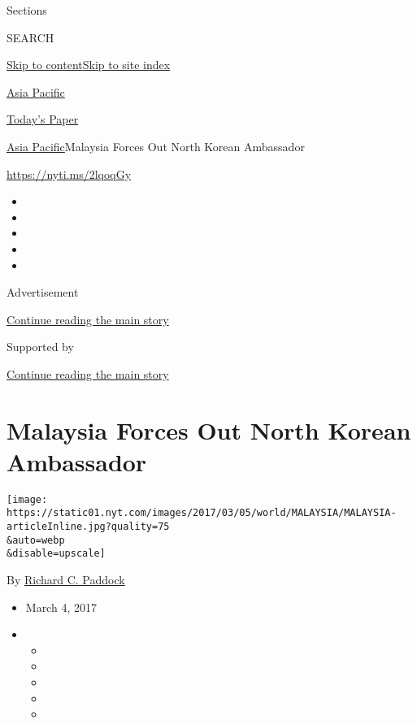 Sections

SEARCH

\protect\hyperlink{site-content}{Skip to
content}\protect\hyperlink{site-index}{Skip to site index}

\href{https://www.nytimes.com/section/world/asia}{Asia Pacific}

\href{https://myaccount.nytimes.com/auth/login?response_type=cookie\&client_id=vi}{}

\href{https://www.nytimes.com/section/todayspaper}{Today's Paper}

\href{/section/world/asia}{Asia Pacific}\textbar{}Malaysia Forces Out
North Korean Ambassador

\url{https://nyti.ms/2lqoqGy}

\begin{itemize}
\item
\item
\item
\item
\item
\end{itemize}

Advertisement

\protect\hyperlink{after-top}{Continue reading the main story}

Supported by

\protect\hyperlink{after-sponsor}{Continue reading the main story}

\hypertarget{malaysia-forces-out-north-korean-ambassador}{%
\section{Malaysia Forces Out North Korean
Ambassador}\label{malaysia-forces-out-north-korean-ambassador}}

\texttt{[image: https://static01.nyt.com/images/2017/03/05/world/MALAYSIA/MALAYSIA-articleInline.jpg?quality=75\\\&auto=webp\\\&disable=upscale]}

By \href{https://www.nytimes.com/by/richard-c-paddock}{Richard C.
Paddock}

\begin{itemize}
\item
  March 4, 2017
\item
  \begin{itemize}
  \item
  \item
  \item
  \item
  \item
  \end{itemize}
\end{itemize}


